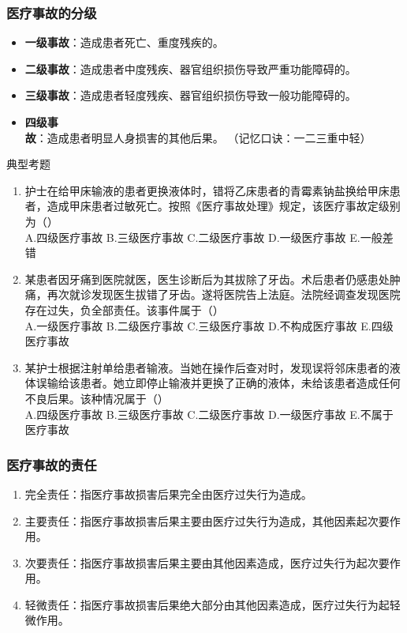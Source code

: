\documentclass[11pt, a4paper]{ctexart}
\begin{document}
\subsubsection{医疗事故的分级}
\begin{itemize}
	\item \textbf{一级事故}：造成患者死亡、重度残疾的。
	\item \textbf{二级事故}：造成患者中度残疾、器官组织损伤导致严重功能障碍的。
	\item \textbf{三级事故}：造成患者轻度残疾、器官组织损伤导致一般功能障碍的。
	\item \textbf{四级事故}：造成患者明显人身损害的其他后果。
	      （记忆口诀：一二三重中轻）
\end{itemize}

\begin{examplebox}{典型考题}
	\begin{enumerate}
		\item 护士在给甲床输液的患者更换液体时，错将乙床患者的青霉素钠盐换给甲床患者，造成甲床患者过敏死亡。按照《医疗事故处理》规定，该医疗事故定级别为（\qquad）\\
		      A.四级医疗事故 \quad B.三级医疗事故 \quad C.二级医疗事故 \quad D.一级医疗事故 \quad E.一般差错
		\item 某患者因牙痛到医院就医，医生诊断后为其拔除了牙齿。术后患者仍感患处肿痛，再次就诊发现医生拔错了牙齿。遂将医院告上法庭。法院经调查发现医院存在过失，负全部责任。该事件属于（\qquad）\\
		      A.一级医疗事故 \quad B.二级医疗事故 \quad C.三级医疗事故 \quad D.不构成医疗事故 \quad E.四级医疗事故
		\item 某护士根据注射单给患者输液。当她在操作后查对时，发现误将邻床患者的液体误输给该患者。她立即停止输液并更换了正确的液体，未给该患者造成任何不良后果。该种情况属于（\qquad）\\
		      A.四级医疗事故 \quad B.三级医疗事故 \quad C.二级医疗事故 \quad D.一级医疗事故 \quad E.不属于医疗事故
	\end{enumerate}
\end{examplebox}

\subsubsection{医疗事故的责任}
\begin{enumerate}
	\item 完全责任：指医疗事故损害后果完全由医疗过失行为造成。
	\item 主要责任：指医疗事故损害后果主要由医疗过失行为造成，其他因素起次要作用。
	\item 次要责任：指医疗事故损害后果主要由其他因素造成，医疗过失行为起次要作用。
	\item 轻微责任：指医疗事故损害后果绝大部分由其他因素造成，医疗过失行为起轻微作用。
\end{enumerate}
\end{document}
